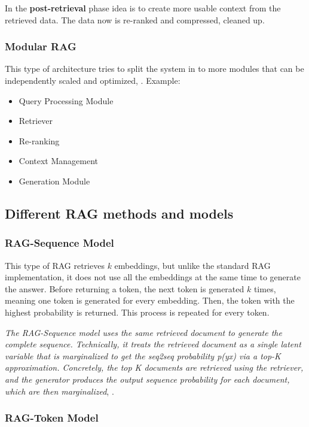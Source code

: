 \documentclass{wseas}
\begin{document}
In the \textbf{post-retrieval} phase idea is to create more usable context 
from the retrieved data. The data now is re-ranked and compressed, cleaned up.

\subsubsection{Modular RAG}

This type of architecture tries to split the system in to more modules
that can be independently scaled and optimized, \cite{Retrieval-Augmented_Generation_for_Large_Language_Models:_A_Survey}. 
Example:
\begin{itemize}
  \item Query Processing Module
  \item Retriever
  \item Re-ranking
  \item Context Management
  \item Generation Module
\end{itemize}


\subsection{Different RAG methods and
models}

\subsubsection{RAG-Sequence Model}

This type of RAG retrieves \(k\) embeddings, but unlike the standard RAG
implementation, it does not use all the embeddings at the same time to
generate the answer. Before returning a token, the next token is
generated \(k\) times, meaning one token is generated for every embedding.
Then, the token with the highest probability is returned. This 
process is repeated for every token.

\emph{The RAG-Sequence model uses the same retrieved document to
generate the complete sequence. Technically, it treats the retrieved
document as a single latent variable that is marginalized to get the
seq2seq probability p(y\textbar x) via a top-K approximation.
Concretely, the top K documents are retrieved using the retriever, and
the generator produces the output sequence probability for each
document, which are then marginalized}, \cite{Retrieval_Augmented_Generation_(RAG)_Explained_Understanding_Key_Concepts}.

\subsubsection{RAG-Token Model}
\end{document}
